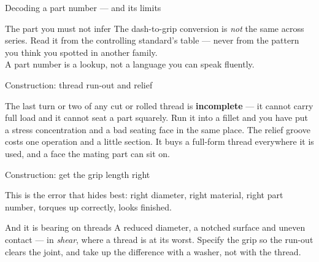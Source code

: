 \documentclass[aspectratio=169,10pt]{beamer}
\begin{document}
\begin{frame}{Decoding a part number --- and its limits}
\centering
{}
\vfill
\raggedright
\begin{alertblock}{The part you must not infer}
The dash-to-grip conversion is \emph{not} the same across series. Read it from the controlling
standard's table --- never from the pattern you think you spotted in another family.\\[4pt]
\alert{A part number is a lookup, not a language you can speak fluently.}
\end{alertblock}
\end{frame}

\begin{frame}{Construction: thread run-out and relief}
\centering
\resizebox{0.95\textwidth}{!}{}
\vfill
\raggedright
The last turn or two of any cut or rolled thread is \textbf{incomplete} --- it cannot carry full load
and it cannot seat a part squarely. Run it into a fillet and you have put a stress concentration and a
bad seating face in the same place.
\vfill
{\small The relief groove costs one operation and a little section. It buys a full-form thread
everywhere it is used, and a face the mating part can sit on.}
\end{frame}

\begin{frame}{Construction: get the grip length right}
\centering
\resizebox{0.95\textwidth}{!}{}
\vfill
\raggedright
This is the error that hides best: right diameter, right material, right part number, torques up
correctly, looks finished.
\vfill
\begin{alertblock}{And it is bearing on threads}
A reduced diameter, a notched surface and uneven contact --- in \emph{shear}, where a thread is at
its worst. Specify the grip so the run-out clears the joint, and take up the difference with a
washer, not with the thread.
\end{alertblock}
\end{frame}
\end{document}
